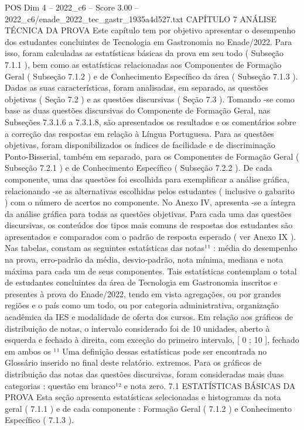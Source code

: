 \begin{textsample}{POS Dim 4 – 2022\_c6 – Score 3.00 – 2022\_c6/enade\_2022\_tec\_gastr\_1935a4d527.txt}  \label{ex:f4_pos_085}
CAPÍTULO 7 ANÁLISE TÉCNICA DA PROVA Este capítulo tem por objetivo apresentar o desempenho dos estudantes concluintes de Tecnologia em Gastronomia no Enade/2022.
Para isso, foram calculadas as estatísticas básicas da prova em seu todo ( Subseção 7.1.1 ), bem como as estatísticas relacionadas aos Componentes de Formação Geral ( Subseção 7.1.2 ) e de Conhecimento Específico da área ( Subseção 7.1.3 ).
Dadas as suas características, foram analisadas, em separado, as questões objetivas ( Seção 7.2 ) e as questões discursivas ( Seção 7.3 ).
Tomando -se como base as duas questões discursivas do Componente de Formação Geral, nas Subseções 7.3.1.6 a 7.3.1.8, são apresentados os resultados e os comentários sobre a correção das respostas em relação à Língua Portuguesa.
Para as questões objetivas, foram disponibilizados os índices de facilidade e de discriminação Ponto-Bisserial, também em separado, para os Componentes de Formação Geral ( Subseção 7.2.1 ) e de Conhecimento Específico ( Subseção 7.2.2 ).
De cada componente, uma das questões foi escolhida para exemplificar a análise gráfica, relacionando -se as alternativas escolhidas pelos estudantes ( inclusive o gabarito ) com o número de acertos no componente.
No Anexo IV, apresenta -se a íntegra da análise gráfica para todas as questões objetivas.
Para cada uma das questões discursivas, os conteúdos dos tipos mais comuns de respostas dos estudantes são apresentados e comparados com o padrão de resposta esperado ( ver Anexo IX ).
Nas tabelas, constam as seguintes estatísticas das notas¹¹ : média do desempenho na prova, erro-padrão da média, desvio-padrão, nota mínima, mediana e nota máxima para cada um de seus componentes.
Tais estatísticas contemplam o total de estudantes concluintes da área de Tecnologia em Gastronomia inscritos e presentes à prova do Enade/2022, tendo em vista agregações, ou por grandes regiões e o país como um todo, ou por categoria administrativa, organização acadêmica da IES e modalidade de oferta dos cursos.
Em relação aos gráficos de distribuição de notas, o intervalo considerado foi de 10 unidades, aberto à esquerda e fechado à direita, com exceção do primeiro intervalo, [ 0 ; 10 ], fechado em ambos os ¹¹ Uma definição dessas estatísticas pode ser encontrada no Glossário inserido no final deste relatório. extremos.
Para os gráficos de distribuição das notas das questões discursivas, foram consideradas mais duas categorias : questão em branco¹² e nota zero. 7.1 ESTATÍSTICAS BÁSICAS DA PROVA Esta seção apresenta estatísticas selecionadas e histogramas da nota geral ( 7.1.1 ) e de cada componente : Formação Geral ( 7.1.2 ) e Conhecimento Específico ( 7.1.3 ).

\end{textsample}

